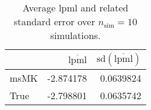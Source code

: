 \begin{table}[H]

\caption{Average lpml and related standard error over $n_{\text{sim}} = 10$ simulations.}
\centering
\begin{tabular}[t]{lrr}
\toprule
  & $\overbar{\text{lpml}}$ & $\text{sd}(\overbar{\text{lpml}})$\\
\midrule
msMK & -2.874178 & 0.0639824\\
True & -2.798801 & 0.0635742\\
\bottomrule
\end{tabular}
\end{table}